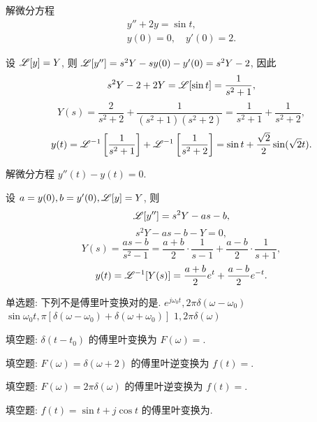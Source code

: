 \begin{example}
	解微分方程
	\begin{align*}
		y''+2y=\sin t,\\
		y(0)=0,\quad y'(0)=2.
	\end{align*}
\end{example}
\begin{solution}
	设 $\mathscr{L}[y]=Y$, 则 $\mathscr{L}[y'']=s^2Y-sy(0)-y'(0)=s^2Y-2$, 因此
		\[s^2Y-2+2Y=\mathscr{L}[\sin t]=\frac{1}{s^2+1},\]
		\[Y(s)=\frac{2}{s^2+2}+\frac{1}{(s^2+1)(s^2+2)}=\frac{1}{s^2+1}+\frac{1}{s^2+2},\]
		\[y(t)=\mathscr{L}^{-1}\left[\frac{1}{s^2+1}\right]+\mathscr{L}^{-1}\left[\frac{1}{s^2+2}\right]
		=\sin t+\frac{\sqrt 2}2\sin(\sqrt 2 t). \]
\end{solution}

\begin{example}
	解微分方程 $y''(t)-y(t)=0$.
\end{example}
\begin{solution}
	设 $a=y(0),b=y'(0),\mathscr{L}[y]=Y$, 则
		\[\mathscr{L}[y'']=s^2Y-as-b,\]
		\[s^2Y-as-b-Y=0,\]
		\[Y(s)=\frac{as-b}{s^2-1}=\frac{a+b}2\cdot\frac1{s-1}+\frac{a-b}2\cdot\frac1{s+1},\]
		\[y(t)=\mathscr{L}^{-1}[Y(s)]=\frac{a+b}2e^t+\frac{a-b}2e^{-t}.\]
\end{solution}





\begin{exercise}
	单选题: 下列不是傅里叶变换对的是.
		{$e^{j\omega_0t},2\pi\delta(\omega-\omega_0)$}%
		{$\sin \omega_0t, \pi[\delta(\omega-\omega_0)+\delta(\omega+\omega_0)]$}%
		{$1,2\pi\delta(\omega)$}	
\end{exercise}


\begin{exercise}
  填空题: $\delta(t-t_0)$ 的傅里叶变换为 $F(\omega)=$.
\end{exercise}


\begin{exercise}
	填空题: $F(\omega)=\delta(\omega+2)$ 的傅里叶逆变换为 $f(t)=$.
\end{exercise}


\begin{exercise}
	填空题: $F(\omega)=2\pi\delta(\omega)$ 的傅里叶逆变换为 $f(t)=$.
\end{exercise}


\begin{exercise}
	填空题: $f(t)=\sin t+j\cos t$ 的傅里叶变换为.
\end{exercise}


